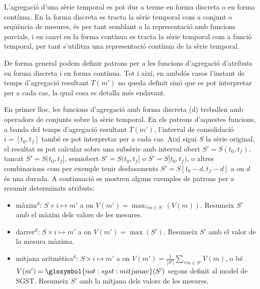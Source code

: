 L'agregació d'una sèrie temporal es pot dur a terme en forma discreta
o en forma contínua.  En la forma discreta es tracta la sèrie temporal
com a conjunt o seqüència de mesures, és per tant semblant a la
representació amb funcions parcials, i en canvi en la forma contínua
es tracta la sèrie temporal com a funció temporal, per tant s'utilitza
una representació contínua de la sèrie temporal.

De forma general podem definir patrons per a les funcions d'agregació
d'atributs en forma discreta i en forma contínua. Tot i així, en
ambdós casos l'instant de temps d'agregació resultant $T(m')$ no queda
definit sinó que es pot interpretar per a cada cas, la qual cosa es detalla
més endavant.


En primer lloc, les funcions d'agregació amb forma discreta (d)
treballen amb operadors de conjunts sobre la sèrie temporal. En els
patrons d'aquestes funcions, a banda del temps d'agregació resultant
$T(m')$, l'interval de consolidació $i=[t_0,t_f]$ també es pot
interpretar per a cada cas. Així sigui $S$ la sèrie original, el
resultat es pot calcular sobre una subsèrie amb interval obert
$S'=S(t_0,t_f)$, tancat $S'=S(t_0,t_f]$, semiobert $S'=S(t_0,t_f]$ o
$S'=S[t_0,t_f)$, o altres combinacions com per exemple tenir
desfasaments $S'=S[t_0-d,t_f-d]$ a on $d$ és una durada. A continuació
es mostren alguns exemples de patrons per a resumir determinats
atributs:
\begin{itemize}
\item màxim$^d$: $S \times i \mapsto m'$ a on $V(m') = \max_{\forall m
    \in S'}(V(m))$. Resumeix $S'$ amb el màxim dels valors de les
  mesures.


\item darrer$^d$: $S \times i \mapsto m'$ a on $V(m') =
  \max(S')$. Resumeix $S'$ amb el valor de la mesura màxima.
\item mitjana aritmètica$^d$: $S \times i \mapsto m'$ a on $V(m') =
  \frac{1}{|S'|} \sum\limits_{\forall m\in S'} V(m)$, o bé $V(m') =
  \glssymbol{not:sgst:mitjanav}(S')$ segons definit al model de
  \gls{SGST}. Resumeix $S'$ amb la mitjana dels valors de les mesures.
\end{itemize}


